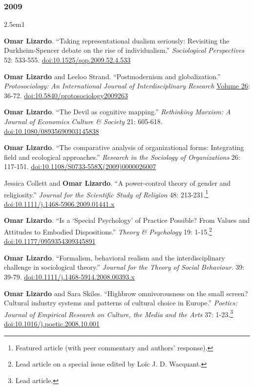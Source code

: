 \documentclass[
]{article}
\newenvironment{cventry}{\begin{hangparas}{2.5em}{1}}{\end{hangparas}}
\begin{document}
\subsubsection{2009}\label{section-10}

\begin{cventry}

\textbf{Omar Lizardo}. ``Taking representational dualism seriously:
Revisiting the Durkheim-Spencer debate on the rise of individualism.''
\emph{Sociological Perspectives} 52: 533-555.
\href{https://doi.org/10.1525/sop.2009.52.4.533}{doi:10.1525/sop.2009.52.4.533}

\textbf{Omar Lizardo} and Leeloo Strand. ``Postmodernism and
globalization.'' \emph{Protosociology: An International Journal of
Interdisciplinary Research}
\href{http://www.protosociology.de/Download/ProtoSociology-Vol26-S.pdf}{Volume
26}: 36-72.
\href{https://doi.org/10.5840/protosociology2009263}{doi:10.5840/protosociology2009263}

\textbf{Omar Lizardo}. ``The Devil as cognitive mapping.''
\emph{Rethinking Marxism: A Journal of Economics Culture \& Society }
21: 605-618.
\href{https://doi.org/10.1080/08935690903145838}{doi:10.1080/08935690903145838}

\textbf{Omar Lizardo}. ``The comparative analysis of organizational
forms: Integrating field and ecological approaches.'' \emph{Research in
the Sociology of Organizations} 26: 117-151.
\href{https://doi.org/10.1108/S0733-558X(2009)0000026007}{doi:10.1108/S0733-558X(2009)0000026007}

Jessica Collett and \textbf{Omar Lizardo}. ``A power-control theory of
gender and religiosity.'' \emph{Journal for the Scientific Study of
Religion} 48: 213-231.\footnote{Featured article (with peer commentary
  and authors' response).}
\href{https://doi.org/10.1111/j.1468-5906.2009.01441.x}{doi:10.1111/j.1468-5906.2009.01441.x}

\textbf{Omar Lizardo}. ``Is a `Special Psychology' of Practice Possible?
From Values and Attitudes to Embodied Dispositions.'' \emph{Theory \&
Psychology} 19: 1-15.\footnote{Lead article on a special issue edited by
  Loïc J. D. Wacquant.}
\href{https://doi.org/10.1177/0959354309345891}{doi:10.1177/0959354309345891}

\textbf{Omar Lizardo}. ``Formalism, behavioral realism and the
interdisciplinary challenge in sociological theory.'' \emph{Journal for
the Theory of Social Behaviour}. 39: 39-79.
\href{https://doi.org/10.1111/j.1468-5914.2008.00393.x}{doi:10.1111/j.1468-5914.2008.00393.x}

\textbf{Omar Lizardo} and Sara Skiles. ``Highbrow omnivorousness on the
small screen? Cultural industry systems and patterns of cultural choice
in Europe.'' \emph{Poetics: Journal of Empirical Research on Culture,
the Media and the Arts} 37: 1-23.\footnote{Lead article.}
\href{https://doi.org/10.1016/j.poetic.2008.10.001}{doi:10.1016/j.poetic.2008.10.001}

\end{cventry}
\end{document}
